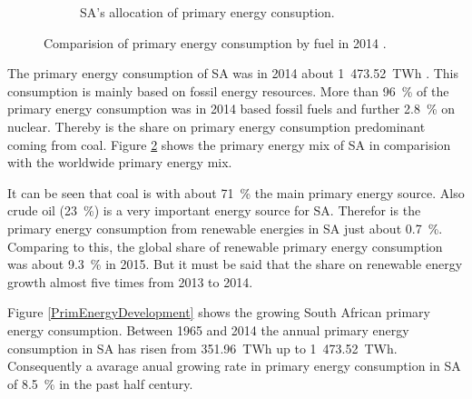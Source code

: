\begin{figure}[!b]
\begin{subfigure}[b]{0.45\textwidth}
                \caption{SA's allocation of primary energy consuption.}\label{PrimSA}
        \end{subfigure}
\caption[Comparision of primary energy consumption by fuel in 2014.]{Comparision of primary energy consumption by fuel in 2014 \cite{BP2015b}.}\label{PEKreis}
\end{figure}
The primary energy consumption of SA was in 2014 about 1~473.52~TWh \cite{BP2015b}. This consumption is mainly based on fossil energy resources. More than 96~\% of the primary energy consumption was in 2014 based fossil fuels and further 2.8~\% on nuclear. Thereby is the share on primary energy consumption predominant coming from coal. Figure \ref{PEKreis} shows the primary energy mix of SA in comparision with the worldwide primary energy mix. \cite{BP2015b}

It can be seen that coal is with about 71~\% the main primary energy source. Also crude oil (23~\%) is a very important energy source for SA. Therefor is the primary energy consumption from renewable energies in SA just about 0.7~\%. Comparing to this, the global share of  renewable primary energy consumption was about 9.3~\% in 2015. But it must be said that the share on renewable energy growth almost five times from 2013 to 2014. \cite{BP2015b}

Figure \ref{PrimEnergyDevelopment} shows the growing South African primary energy consumption. Between 1965 and 2014 the annual primary energy consumption in SA has risen from 351.96~TWh up to 1~473.52~TWh. Consequently a avarage anual growing rate in primary energy consumption in SA of 8.5~\% in the past half century. \cite{BP2015c}

